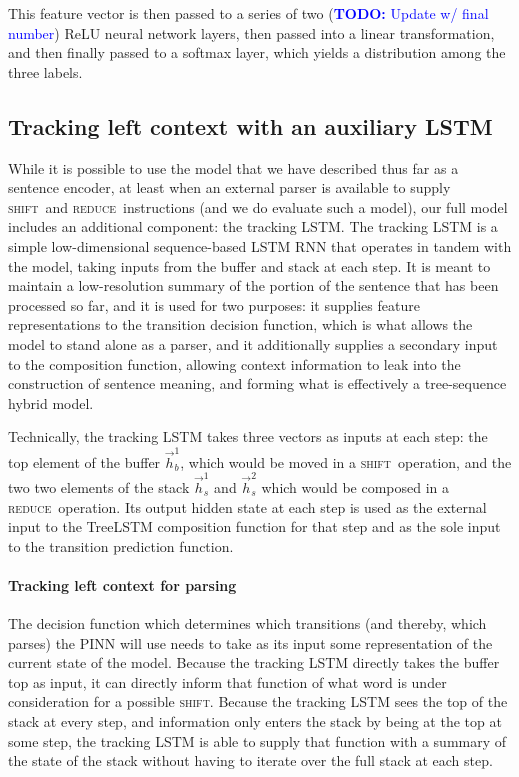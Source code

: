 \documentclass[11pt,letterpaper]{article}
\newcommand\todo[1]{\textcolor{blue}{\textbf{TODO:} #1}}
\newcommand{\shift}{\textsc{shift}}
\newcommand{\reduce}{\textsc{reduce}}
\begin{document}
This feature vector is then passed to a series of two (\todo{Update w/ final number}) ReLU neural network layers, then passed into a linear transformation, and then finally passed to a softmax layer, which yields a distribution among the three labels.

\subsection{Tracking left context with an auxiliary LSTM}

While it is possible to use the model that we have described thus far as a sentence encoder, at least when an external parser is available to supply \shift~and \reduce~instructions (and we do evaluate such a model), our full model includes an additional component: the tracking LSTM. The tracking LSTM is a simple low-dimensional sequence-based LSTM RNN that operates in tandem with the model, taking inputs from the buffer and stack at each step. It is meant to maintain a low-resolution summary of the portion of the sentence that has been processed so far, and it is used for two purposes: it supplies feature representations to the transition decision function, which is what allows the model to stand alone as a parser, and it additionally supplies a secondary input to the composition function, allowing context information to leak into the construction of sentence meaning, and forming what is effectively a tree-sequence hybrid model.

Technically, the tracking LSTM takes three vectors as inputs at each step: the top element of the buffer $\vec{h}_b^1$, which would be moved in a \shift~operation, and the two two elements of the stack $\vec{h}_s^1$ and $\vec{h}_s^2$ which would be composed in a \reduce~operation. Its output hidden state at each step is used as the external input to the TreeLSTM composition function for that step and as the sole input to the transition prediction function.

\paragraph{Tracking left context for parsing} The decision function which determines which transitions (and thereby, which parses) the PINN will use needs to take as its input some representation of the current state of the model. Because the tracking LSTM directly takes the buffer top as input, it can directly inform that function of what word is under consideration for a possible \shift. Because the tracking LSTM sees the top of the stack at every step, and information only enters the stack by being at the top at some step, the tracking LSTM is able to supply that function with a summary of the state of the stack without having to iterate over the full stack at each step.
\end{document}
